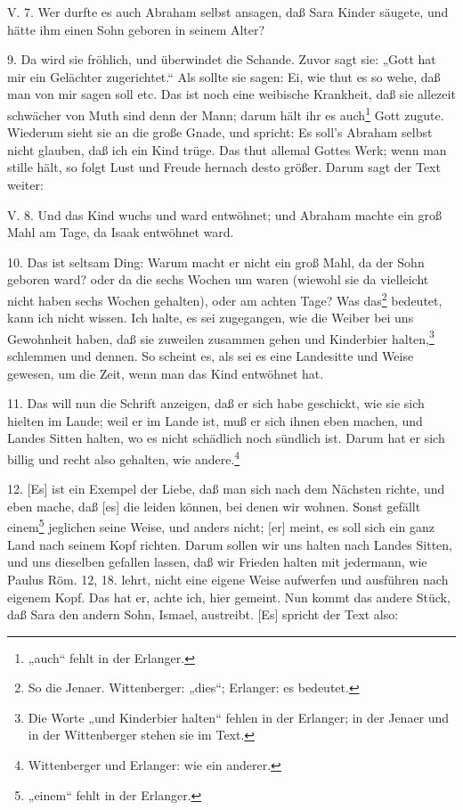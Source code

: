 V. 7. Wer durfte es auch Abraham selbst ansagen, daß Sara Kinder säugete, und hätte ihm einen Sohn geboren in seinem Alter?

9. Da wird sie fröhlich, und überwindet die Schande. Zuvor sagt sie: „Gott hat mir ein Gelächter zugerichtet.“ Als sollte sie sagen: Ei, wie thut es so wehe, daß man von mir sagen soll etc. Das ist noch eine weibische Krankheit, daß sie allezeit schwächer von Muth sind denn der Mann; darum hält ihr es auch\footnote{„auch“ fehlt in der Erlanger.} Gott zugute. Wiederum sieht sie an die große Gnade, und spricht: Es soll's Abraham selbst nicht glauben, daß ich ein Kind trüge. Das thut allemal Gottes Werk; wenn man stille hält, so folgt Lust und Freude hernach desto größer. Darum sagt der Text weiter:

V. 8. Und das Kind wuchs und ward entwöhnet; und Abraham machte ein groß Mahl am Tage, da Isaak entwöhnet ward.

10. Das ist seltsam Ding: Warum macht er nicht ein groß Mahl, da der Sohn geboren ward? oder da die sechs Wochen um waren (wiewohl sie da vielleicht nicht haben sechs Wochen gehalten), oder am achten Tage? Was das\footnote{So die Jenaer. Wittenberger: „dies“; Erlanger: es bedeutet.} bedeutet, kann ich nicht wissen. Ich halte, es sei zugegangen, wie die Weiber bei uns Gewohnheit haben, daß sie zuweilen zusammen gehen und Kinderbier halten,\footnote{Die Worte „und Kinderbier halten“ fehlen in der Erlanger; in der Jenaer und in der Wittenberger stehen sie im Text.} schlemmen und dennen. So scheint es, als sei es eine Landesitte und Weise gewesen, um die Zeit, wenn man das Kind entwöhnet hat.

11. Das will nun die Schrift anzeigen, daß er sich habe geschickt, wie sie sich hielten im Lande; weil er im Lande ist, muß er sich ihnen eben machen, und Landes Sitten halten, wo es nicht schädlich noch sündlich ist. Darum hat er sich billig und recht also gehalten, wie andere.\footnote{Wittenberger und Erlanger: wie ein anderer.}

12. [Es] ist ein Exempel der Liebe, daß man sich nach dem Nächsten richte, und eben mache, daß [es] die leiden können, bei denen wir wohnen. Sonst gefällt einem\footnote{„einem“ fehlt in der Erlanger.} jeglichen seine Weise, und anders nicht; [er] meint, es soll sich ein ganz Land nach seinem Kopf richten. Darum sollen wir uns halten nach Landes Sitten, und uns dieselben gefallen lassen, daß wir Frieden halten mit jedermann, wie Paulus Röm. 12, 18. lehrt, nicht eine eigene Weise aufwerfen und ausführen nach eigenem Kopf. Das hat er, achte ich, hier gemeint. Nun kommt das andere Stück, daß Sara den andern Sohn, Ismael, austreibt. [Es] spricht der Text also:

